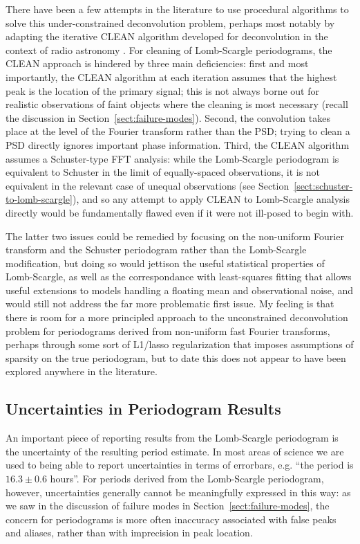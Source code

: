 \documentclass[preprint]{aastex}
\newcommand{\Sect}[1]{Section~\ref{sect:#1}}
\newcommand{\sect}[1]{\Sect{#1}}
\newcommand{\sectlabel}[1]{\label{sect:#1}}
\begin{document}
There have been a few attempts in the literature to use procedural algorithms
to solve this under-constrained deconvolution problem, perhaps most notably
by adapting the iterative CLEAN algorithm developed for deconvolution in the
context of radio astronomy \citep{Roberts87}.
For cleaning of Lomb-Scargle periodograms, the CLEAN approach is hindered by
three main deficiencies: first and most importantly, the CLEAN algorithm at each
iteration assumes that the highest peak is the location of the primary signal;
this is not always borne out for realistic observations of faint objects where
the cleaning is most necessary (recall the discussion in \sect{failure-modes}).
Second, the convolution takes place at the level of the Fourier transform
rather than the PSD; trying to clean a PSD directly ignores important phase
information. Third, the CLEAN algorithm assumes a Schuster-type FFT analysis:
while the Lomb-Scargle periodogram is equivalent to Schuster in the limit of
equally-spaced observations, it is not equivalent in the relevant case of
unequal observations (see \sect{schuster-to-lomb-scargle}),
and so any attempt to apply CLEAN to Lomb-Scargle analysis directly would
be fundamentally flawed even if it were not ill-posed to begin with.

The latter two issues could be remedied by focusing on the non-uniform
Fourier transform and the Schuster periodogram rather than the Lomb-Scargle
modification, but doing so would jettison the useful statistical properties
of Lomb-Scargle, as well as the correspondance with least-squares fitting
that allows useful extensions to models handling a floating mean and
observational noise, and would still not address the far more problematic
first issue.
My feeling is that there is room for a more principled approach to the
unconstrained deconvolution problem for periodograms derived from non-uniform
fast Fourier transforms, perhaps through some sort of L1/lasso regularization
that imposes assumptions of sparsity on the true periodogram, but to date this 
does not appear to have been explored anywhere in the literature.


\subsection{Uncertainties in Periodogram Results}
\sectlabel{uncertainties}
An important piece of reporting results from the Lomb-Scargle periodogram is
the uncertainty of the resulting period estimate.
In most areas of science we are used to being able to report uncertainties in
terms of errorbars, {e.g.} ``the period is $16.3 \pm 0.6$ hours''.
For periods derived from the Lomb-Scargle periodogram, however, uncertainties
generally cannot be meaningfully expressed in this way:
as we saw in the discussion of failure modes in \sect{failure-modes},
the concern for periodograms is more often inaccuracy associated with
false peaks and aliases, rather than with imprecision in peak location.
\end{document}
